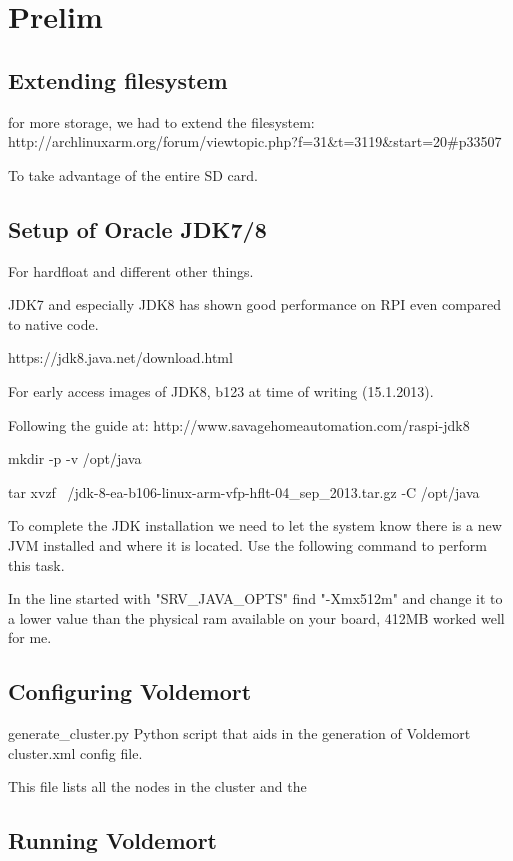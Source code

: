 \section{Prelim}

\subsection{Extending filesystem}
for more storage, we had to extend the filesystem:
http://archlinuxarm.org/forum/viewtopic.php?f=31&t=3119&start=20#p33507

To take advantage of the entire SD card.

\subsection{Setup of Oracle JDK7/8}
For hardfloat and different other things.

JDK7 and especially JDK8 has shown good performance on RPI even compared to native code.

https://jdk8.java.net/download.html

For early access images of JDK8, b123 at time of writing (15.1.2013).

Following the guide at: http://www.savagehomeautomation.com/raspi-jdk8

mkdir -p -v /opt/java

tar xvzf ~/jdk-8-ea-b106-linux-arm-vfp-hflt-04_sep_2013.tar.gz -C /opt/java

To complete the JDK installation we need to let the system know there is a new JVM installed and where it is located.  Use the following command to perform this task.


In the line started with "SRV_JAVA_OPTS" find "-Xmx512m" and change it to a lower value than the physical ram available on your board, 412MB worked well for me.


\subsection{Configuring Voldemort}

generate\_cluster.py
Python script that aids in the generation of Voldemort cluster.xml config file.

This file lists all the nodes in the cluster and the 
\subsection{Running Voldemort} 

